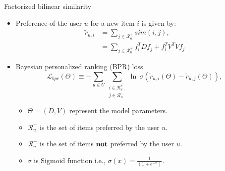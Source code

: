 \documentclass[t,xcolor={dvipsnames,usenames}]{beamer}
\begin{document}
\begin{frame}{Factorized bilinear similarity}
  
  
  \begin{itemize}
    \item Preference of the user $u$ for a new item $i$ is given by:
      \begin{equation*} 
        \begin{split}
           \tilde{r}_{u,i} &= \sum_{j\in \mathcal{R}_u^+} sim(i,j) , \\
                           &= \sum_{j\in \mathcal{R}_u^+} f_i ^T D f_j + f_i ^T
          V^TV f_j
        \end{split}
      \end{equation*}   
    \item Bayesian personalized ranking (BPR) loss
      \begin{equation*} 
        \mathcal{L}_{bpr}(\Theta) \equiv - \sum_{u \in U} \sum_{\substack{i \in \mathcal{R}_u^+ ,\\  j \in \mathcal{R}_u^-}}  \ln \, \sigma(\tilde{r}_{u,i}(\Theta) - \tilde{r}_{u,j}(\Theta) ),
      \end{equation*}
      \begin{itemize}
          \item $\Theta=(D, V)$ represent the model parameters.
          \item $\mathcal{R}_u^+$  is the set of items preferred by the user
            $u$.
          \item $\mathcal{R}_u^-$  is the set of items $\bf{not}$ preferred by the user
            $u$.
          \item $\sigma$ is Sigmoid function i.e., $\sigma(x) = \frac{1}{(1+
            e^{-x})}$.
      \end{itemize}
  \end{itemize}

\end{frame}
\end{document}

